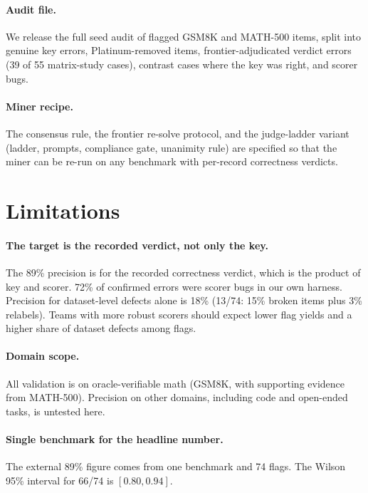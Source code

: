 \documentclass[11pt]{article}
\begin{document}
\paragraph{Audit file.}
We release the full seed audit of flagged GSM8K and MATH-500 items, split into genuine key errors, Platinum-removed items, frontier-adjudicated verdict errors (39 of 55 matrix-study cases), contrast cases where the key was right, and scorer bugs.

\paragraph{Miner recipe.}
The consensus rule, the frontier re-solve protocol, and the judge-ladder variant (ladder, prompts, compliance gate, unanimity rule) are specified so that the miner can be re-run on any benchmark with per-record correctness verdicts.

\section{Limitations}

\paragraph{The target is the recorded verdict, not only the key.}
The 89\% precision is for the recorded correctness verdict, which is the product of key and scorer.
72\% of confirmed errors were scorer bugs in our own harness.
Precision for dataset-level defects alone is 18\% (13/74: 15\% broken items plus 3\% relabels).
Teams with more robust scorers should expect lower flag yields and a higher share of dataset defects among flags.

\paragraph{Domain scope.}
All validation is on oracle-verifiable math (GSM8K, with supporting evidence from MATH-500).
Precision on other domains, including code and open-ended tasks, is untested here.

\paragraph{Single benchmark for the headline number.}
The external 89\% figure comes from one benchmark and 74 flags.
The Wilson 95\% interval for 66/74 is $[0.80, 0.94]$.
\end{document}
